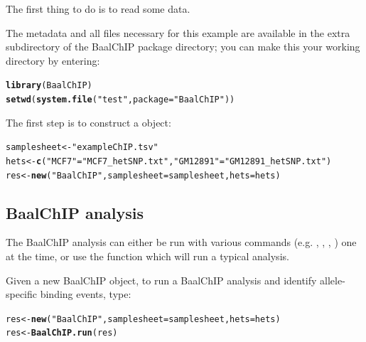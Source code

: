 \documentclass{article}\usepackage[]{graphicx}\usepackage[usenames,dvipsnames]{color}
\makeatletter
\newcommand{\hlstr}[1]{\textcolor[rgb]{0.192,0.494,0.8}{#1}}%
\newcommand{\hlstd}[1]{\textcolor[rgb]{0.345,0.345,0.345}{#1}}%
\newcommand{\hlkwb}[1]{\textcolor[rgb]{0.69,0.353,0.396}{#1}}%
\newcommand{\hlkwc}[1]{\textcolor[rgb]{0.333,0.667,0.333}{#1}}%
\newcommand{\hlkwd}[1]{\textcolor[rgb]{0.737,0.353,0.396}{\textbf{#1}}}%
\newenvironment{kframe}{%
 \def\at@end@of@kframe{}%
 \ifinner\ifhmode%
  \def\at@end@of@kframe{\end{minipage}}%
  \begin{minipage}{\columnwidth}%
 \fi\fi%
 \def\FrameCommand##1{\hskip\@totalleftmargin \hskip-\fboxsep
 \colorbox{shadecolor}{##1}\hskip-\fboxsep
     \hskip-\linewidth \hskip-\@totalleftmargin \hskip\columnwidth}%
 \MakeFramed {\advance\hsize-\width
   \@totalleftmargin\z@ \linewidth\hsize
   \@setminipage}}%
 {\par\unskip\endMakeFramed%
 \at@end@of@kframe}
\newenvironment{knitrout}{}{} %
\makeatother
\begin{document}
The first thing to do is to read some data.

The metadata and all files necessary for this example are available in the extra subdirectory
of the BaalChIP package directory; you can make this your working directory by entering:

\begin{knitrout}
\color{fgcolor}\begin{kframe}
\begin{alltt}
\hlkwd{library}\hlstd{(BaalChIP)}
\hlkwd{setwd}\hlstd{(}\hlkwd{system.file}\hlstd{(}\hlstr{"test"}\hlstd{,}\hlkwc{package}\hlstd{=}\hlstr{"BaalChIP"}\hlstd{))}
\end{alltt}
\end{kframe}
\end{knitrout}

The first step is to construct a  object:
\begin{knitrout}
\color{fgcolor}\begin{kframe}
\begin{alltt}
\hlstd{samplesheet} \hlkwb{<-} \hlstr{"exampleChIP.tsv"}
\hlstd{hets} \hlkwb{<-} \hlkwd{c}\hlstd{(}\hlstr{"MCF7"}\hlstd{=}\hlstr{"MCF7_hetSNP.txt"}\hlstd{,} \hlstr{"GM12891"}\hlstd{=}\hlstr{"GM12891_hetSNP.txt"}\hlstd{)}
\hlstd{res} \hlkwb{<-} \hlkwd{new}\hlstd{(}\hlstr{"BaalChIP"}\hlstd{,} \hlkwc{samplesheet}\hlstd{=samplesheet,} \hlkwc{hets}\hlstd{=hets)}
\end{alltt}
\end{kframe}
\end{knitrout}

\subsection{BaalChIP analysis}

The BaalChIP analysis can either be run with various commands (e.g. , , , ) one at the time, or use the function  which will run a typical analysis. 

Given a new BaalChIP object, to run a BaalChIP analysis and identify allele-specific binding events, type:
\begin{knitrout}
\color{fgcolor}\begin{kframe}
\begin{alltt}
\hlstd{res} \hlkwb{<-} \hlkwd{new}\hlstd{(}\hlstr{"BaalChIP"}\hlstd{,} \hlkwc{samplesheet}\hlstd{=samplesheet,} \hlkwc{hets}\hlstd{=hets)}
\hlstd{res} \hlkwb{<-} \hlkwd{BaalChIP.run}\hlstd{(res)}
\end{alltt}
\end{kframe}
\end{knitrout}
\end{document}
